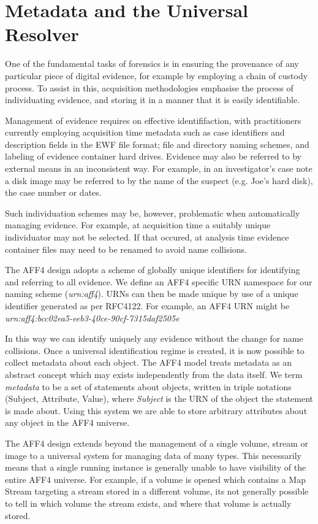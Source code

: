 \documentclass[10pt, conference]{IEEEtran}
\begin{document}
\section{Metadata and the Universal Resolver}
\label{resolver}
One of the fundamental tasks of forensics is in ensuring the
provenance of any particular piece of digital evidence, for example by
employing a chain of custody process. To assist in this, acquisition
methodologies emphasise the process of individuating evidence, and
storing it in a manner that it is easily identifiable.

Management of evidence requires on effective identififaction, with
practitioners currently employing acquisition time metadata such as
case identifiers and description fields in the EWF file format; file
and directory naming schemes, and labeling of evidence container hard
drives. Evidence may also be referred to by external means in an
inconsistent way. For example, in an investigator's case note a disk
image may be referred to by the name of the suspect (e.g. Joe's hard
disk), the case number or dates.

Such individuation schemes may be, however, problematic when
automatically managing evidence. For example, at acquisition time a
suitably unique individuator may not be selected. If that occured, at
analysis time evidence container files may need to be renamed to avoid
name collisions.

The AFF4 design adopts a scheme of globally unique identifiers for
identifying and referring to all evidence. We define an AFF4 specific
URN namespace\cite{RFC1737} for our naming scheme (\emph{urn:aff4}).
URNs can then be made unique by use of a unique identifier generated
as per RFC4122\cite{RFC4122}. For example, an AFF4 URN might be
\emph{urn:aff4:bcc02ea5-eeb3-40ce-90cf-7315daf2505e}

In this way we can identify uniquely any evidence without the change
for name collisions. Once a universal identification regime is
created, it is now possible to collect metadata about each object. The
AFF4 model treats metadata as an abstract concept which may exists
independently from the data itself. We term {\em metadata} to be a set
of statements about objects, written in triple notations (Subject,
Attribute, Value), where {\em Subject} is the URN of the object the
statement is made about. Using this system we are able to store
arbitrary attributes about any object in the AFF4 universe.

The AFF4 design extends beyond the management of a single volume,
stream or image to a universal system for managing data of many
types. This necessarily means that a single running instance is
generally unable to have visibility of the entire AFF4 universe. For
example, if a volume is opened which contains a Map Stream targeting a
stream stored in a different volume, its not generally possible to
tell in which volume the stream exists, and where that volume is
actually stored.
\end{document}
